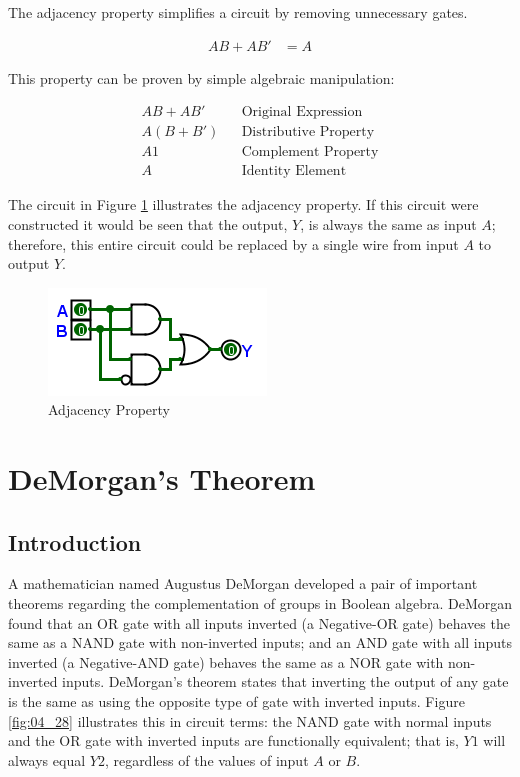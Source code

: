 The adjacency property simplifies a circuit by removing unnecessary gates.

\begin{align}
  \label{BF:eq:adjacency}
  AB + AB' &= A
\end{align}

This property can be proven by simple algebraic manipulation:

\begin{align}
  \label{BF:eq:adjacency_solved}
  AB + AB' && \text{Original Expression} \\
  \nonumber
  A ( B + B') && \text{Distributive Property} \\
  \nonumber
  A1 && \text{Complement Property} \\
  \nonumber
  A && \text{Identity Element}
\end{align}

The circuit in Figure \ref{fig:04_27} illustrates the adjacency property. If this circuit were constructed it would be seen that the output, $ Y $, is always the same as input $ A $; therefore, this entire circuit could be replaced by a single wire from input $ A $ to output $ Y $.

\begin{figure}[H]
	\centering
	\includegraphics[width=\maxwidth{.95\linewidth}]{gfx/04_27}
	\caption{Adjacency Property}
	\label{fig:04_27}
\end{figure}

\section{DeMorgan's Theorem}
\label{BF:sec:demorgans_theorem}
\subsection{Introduction}
\label{BF:subsec:introduction_demorgans}

A mathematician named Augustus DeMorgan developed a pair of important theorems regarding the complementation of groups in Boolean algebra. DeMorgan found that an \textsf{OR} gate with all inputs inverted (a Negative-\textsf{OR} gate) behaves the same as a \textsf{NAND}  gate with non-inverted inputs; and an \textsf{AND} gate with all inputs inverted (a Negative-\textsf{AND} gate) behaves the same as a \textsf{NOR} gate with non-inverted inputs. DeMorgan's theorem states that inverting the output of any gate is the same as using the opposite type of gate with inverted inputs. Figure \ref{fig:04_28} illustrates this in circuit terms: the \textsf{NAND} gate with normal inputs and the \textsf{OR} gate with inverted inputs are functionally equivalent; that is, $ Y1 $ will always equal $ Y2 $, regardless of the values of input $ A $ or $ B $.  

